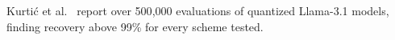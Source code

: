 Kurti\'c et al.~\cite{kurtic2024halfmillion} report over 500{,}000 evaluations of quantized Llama-3.1 models, finding recovery above 99\% for every scheme tested.

